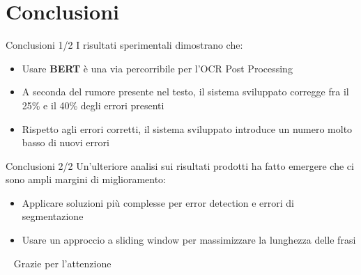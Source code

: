 \documentclass{beamer}
\begin{document}
%
%

\section{Conclusioni}
\begin{frame}{Conclusioni 1/2}
I risultati sperimentali dimostrano che:
\begin{itemize}
	\item Usare \textbf{BERT} è una via percorribile per l'OCR Post Processing
	\item A seconda del rumore presente nel testo, il sistema sviluppato corregge fra il 25\% e il 40\% degli errori presenti
	\item Rispetto agli errori corretti, il sistema sviluppato introduce un numero molto basso di nuovi errori
\end{itemize}
\end{frame}


\begin{frame}{Conclusioni 2/2}
Un'ulteriore analisi sui risultati prodotti ha fatto emergere che ci sono ampli margini di miglioramento:
\begin{itemize}
\item Applicare soluzioni più complesse per error detection e errori di segmentazione
\item Usare un approccio a sliding window per massimizzare la lunghezza delle frasi
\end{itemize}

\end{frame}



\begin{frame}{\ }
\huge
{Grazie per l'attenzione}
\end{frame}
	
\end{document}

